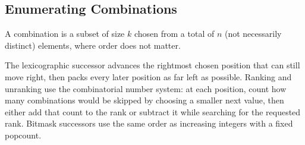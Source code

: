 \subsection{Enumerating Combinations}
\label{sec:6.2.4}
A combination is a subset of size $k$ chosen from a total of $n$ (not necessarily distinct) elements, where order does not matter.

The lexicographic successor advances the rightmost chosen position that can still move right, then packs every later position as far left as possible. Ranking and unranking use the combinatorial number system: at each position, count how many combinations would be skipped by choosing a smaller next value, then either add that count to the rank or subtract it while searching for the requested rank. Bitmask successors use the same order as increasing integers with a fixed popcount.

